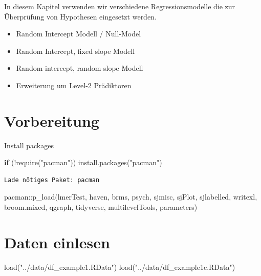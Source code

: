 \documentclass[
  letterpaper,
  DIV=11,
  numbers=noendperiod]{scrreprt}
\newenvironment{Shaded}{\begin{snugshade}}{\end{snugshade}}
\newcommand{\ControlFlowTok}[1]{\textcolor[rgb]{0.00,0.23,0.31}{\textbf{#1}}}
\newcommand{\FunctionTok}[1]{\textcolor[rgb]{0.28,0.35,0.67}{#1}}
\newcommand{\NormalTok}[1]{\textcolor[rgb]{0.00,0.23,0.31}{#1}}
\newcommand{\SpecialCharTok}[1]{\textcolor[rgb]{0.37,0.37,0.37}{#1}}
\newcommand{\StringTok}[1]{\textcolor[rgb]{0.13,0.47,0.30}{#1}}
\providecommand{\tightlist}{%
  \setlength{\itemsep}{0pt}\setlength{\parskip}{0pt}}\usepackage{longtable,booktabs,array}
\begin{document}
In diesem Kapitel verwenden wir verschiedene Regressionsmodelle die zur
Überprüfung von Hypothesen eingesetzt werden.

\begin{itemize}
\tightlist
\item
  Random Intercept Modell / Null-Model
\item
  Random Intercept, fixed slope Modell
\item
  Random intercept, random slope Modell
\item
  Erweiterung um Level-2 Prädiktoren
\end{itemize}

\section{Vorbereitung}\label{vorbereitung}

Install packages

\begin{Shaded}
\begin{Highlighting}[]
\ControlFlowTok{if}\NormalTok{ (}\SpecialCharTok{!}\FunctionTok{require}\NormalTok{(}\StringTok{"pacman"}\NormalTok{)) }\FunctionTok{install.packages}\NormalTok{(}\StringTok{"pacman"}\NormalTok{)}
\end{Highlighting}
\end{Shaded}

\begin{verbatim}
Lade nötiges Paket: pacman
\end{verbatim}

\begin{Shaded}
\begin{Highlighting}[]
\NormalTok{pacman}\SpecialCharTok{::}\FunctionTok{p\_load}\NormalTok{(lmerTest, haven, brms, psych,}
\NormalTok{               sjmisc, sjPlot, sjlabelled, writexl, broom.mixed, qgraph,}
\NormalTok{               tidyverse, multilevelTools, parameters)}
\end{Highlighting}
\end{Shaded}

\section{Daten einlesen}\label{daten-einlesen-1}

\begin{Shaded}
\begin{Highlighting}[]
\FunctionTok{load}\NormalTok{(}\StringTok{"../data/df\_example1.RData"}\NormalTok{)}
\FunctionTok{load}\NormalTok{(}\StringTok{"../data/df\_example1c.RData"}\NormalTok{)}
\end{Highlighting}
\end{Shaded}
\end{document}
